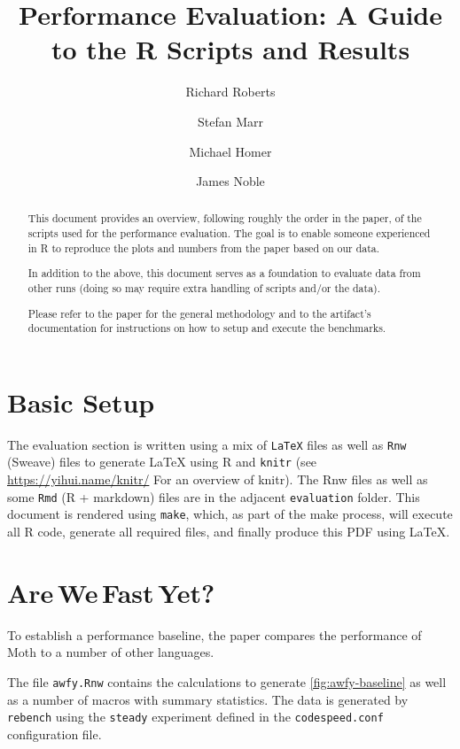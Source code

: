\documentclass[a4paper,USenglish]{darts-v2019}
\title{Performance Evaluation: A Guide to the R Scripts and Results}
\author{Richard Roberts}{School of Design, Victoria University of Wellington}{rykardo.r@gmail.com}{https://orcid.org/0000-0002-3462-8539}{}
\author{Stefan Marr}{School of Computing, University of Kent}{s.marr@kent.ac.uk}{https://orcid.org0000-0001-9059-5180}{}
\author{Michael Homer}{School of Engineering and Computer Science, Victoria University of Wellington}{mwh@ecs.vuw.ac.nz}{}{}
\author{James Noble}{School of Engineering and Computer Science, Victoria University of Wellington}{kjx@ecs.vuw.ac.nz}{https://orcid.org/0000-0001-9036-5692}{}
\def\AWFY{Are\,We\,Fast\,Yet\xspace}
\newcommand{\code}[1]{\texttt{#1}}
\begin{document}
\maketitle

\begin{abstract}
This document provides an overview,
following roughly the order in the paper,
of the scripts used for the performance evaluation.
The goal is to enable
someone experienced in R
to reproduce the plots and numbers from the paper
based on our data.

In addition to the above, this document serves as  
a foundation to evaluate data from other runs
(doing so may require extra handling of scripts and/or the data).

Please refer to the paper for the general methodology and 
to the artifact's documentation for instructions on how
to setup and execute the benchmarks.
\end{abstract}

\section{Basic Setup}

The evaluation section is written using a mix of \code{LaTeX} files
as well as \code{Rnw} (Sweave) files to generate LaTeX using R and \code{knitr}
(see \url{https://yihui.name/knitr/} For an overview of knitr).
%
The Rnw files as well as some \code{Rmd} (R + markdown) files are in the
adjacent \code{evaluation} folder.
%
This document is rendered using \code{make},
which, as part of the make process,
will execute all R code, generate all required files,
and finally produce this PDF using LaTeX.

\section{\AWFY?}
\label{sec:baseline-perf}

To establish a performance baseline,
the paper compares the performance of Moth
to a number of other languages.

The file \code{awfy.Rnw} contains the calculations to generate
\cref{fig:awfy-baseline} as well as a number of macros with summary statistics.
The data is generated by \code{rebench} using the \code{steady} experiment
defined in the \code{codespeed.conf} configuration file.
\end{document}
